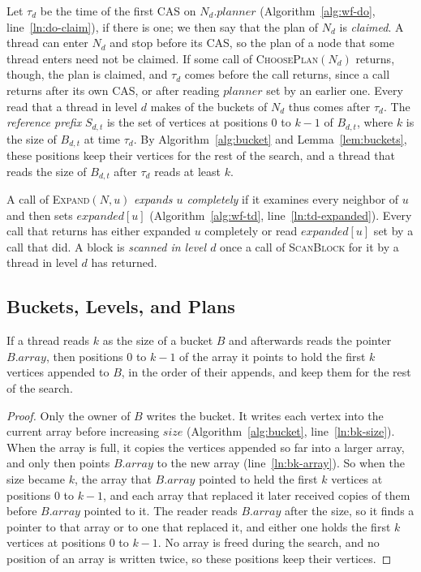 Let $\tau_d$ be the time of the first CAS on $N_d.\mathit{planner}$ (Algorithm~\ref{alg:wf-do}, line~\ref{ln:do-claim}), if there is one; we then say that the plan of $N_d$ is \emph{claimed}. A thread can enter $N_d$ and stop before its CAS, so the plan of a node that some thread enters need not be claimed. If some call of \textsc{ChoosePlan}$(N_d)$ returns, though, the plan is claimed, and $\tau_d$ comes before the call returns, since a call returns after its own CAS, or after reading $\mathit{planner}$ set by an earlier one. Every read that a thread in level $d$ makes of the buckets of $N_d$ thus comes after $\tau_d$. The \emph{reference prefix} $S_{d,t}$ is the set of vertices at positions $0$ to $k-1$ of $B_{d,t}$, where $k$ is the size of $B_{d,t}$ at time $\tau_d$. By Algorithm~\ref{alg:bucket} and Lemma~\ref{lem:buckets}, these positions keep their vertices for the rest of the search, and a thread that reads the size of $B_{d,t}$ after $\tau_d$ reads at least $k$.

A call of \textsc{Expand}$(N, u)$ \emph{expands $u$ completely} if it examines every neighbor of $u$ and then sets $\mathit{expanded}[u]$ (Algorithm~\ref{alg:wf-td}, line~\ref{ln:td-expanded}). Every call that returns has either expanded $u$ completely or read $\mathit{expanded}[u]$ set by a call that did. A block is \emph{scanned in level $d$} once a call of \textsc{ScanBlock} for it by a thread in level $d$ has returned.

\subsection{Buckets, Levels, and Plans}
\label{sec:pf-structures}

\begin{lemma}[Buckets]
\label{lem:buckets}
If a thread reads $k$ as the size of a bucket $B$ and afterwards reads the pointer $B.\mathit{array}$, then positions $0$ to $k-1$ of the array it points to hold the first $k$ vertices appended to $B$, in the order of their appends, and keep them for the rest of the search.
\end{lemma}
\begin{proof}
Only the owner of $B$ writes the bucket. It writes each vertex into the current array before increasing $\mathit{size}$ (Algorithm~\ref{alg:bucket}, line~\ref{ln:bk-size}). When the array is full, it copies the vertices appended so far into a larger array, and only then points $B.\mathit{array}$ to the new array (line~\ref{ln:bk-array}). So when the size became $k$, the array that $B.\mathit{array}$ pointed to held the first $k$ vertices at positions $0$ to $k-1$, and each array that replaced it later received copies of them before $B.\mathit{array}$ pointed to it. The reader reads $B.\mathit{array}$ after the size, so it finds a pointer to that array or to one that replaced it, and either one holds the first $k$ vertices at positions $0$ to $k-1$. No array is freed during the search, and no position of an array is written twice, so these positions keep their vertices.
\end{proof}

